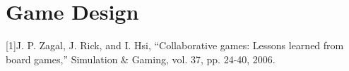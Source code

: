 \section{Game Design}


[1]J. P. Zagal, J. Rick, and I. Hsi, “Collaborative games: Lessons learned from board games,” Simulation & Gaming, vol. 37, pp. 24-40, 2006.
